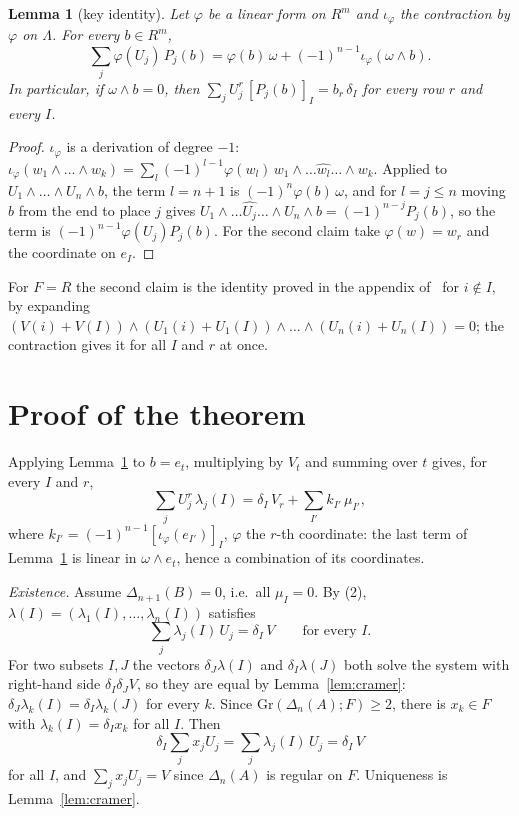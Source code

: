 \documentclass[11pt]{amsart}
\newtheorem{lemma}[theorem]{Lemma}
\theoremstyle{definition}
\theoremstyle{remark}
\newcommand{\Gr}{\mathrm{Gr}}
\newcommand{\co}[2]{[#1]_{#2}}
\begin{document}
\begin{lemma}[key identity]\label{lem:key}
Let $\varphi$ be a linear form on $R^m$ and $\iota_\varphi$ the contraction
by $\varphi$ on $\Lambda$.  For every $b\in R^m$,
\[
  \textstyle\sum_j\varphi(U_j)\,P_j(b)=\varphi(b)\,\omega
  +(-1)^{n-1}\iota_\varphi(\omega\wedge b).
\]
In particular, if $\omega\wedge b=0$, then
$\sum_jU_j^r\,\co{P_j(b)}I=b_r\,\delta_I$ for every row $r$ and every $I$.
\end{lemma}

\begin{proof}
$\iota_\varphi$ is a derivation of degree $-1$:
$\iota_\varphi(w_1\wedge\dots\wedge w_k)=\sum_l(-1)^{l-1}\varphi(w_l)\,
w_1\wedge\dots\widehat{w_l}\dots\wedge w_k$.  Applied to
$U_1\wedge\dots\wedge U_n\wedge b$, the term $l=n+1$ is
$(-1)^n\varphi(b)\,\omega$, and for $l=j\leq n$ moving $b$ from the end
to place $j$ gives $U_1\wedge\dots\widehat{U_j}\dots\wedge U_n\wedge
b=(-1)^{n-j}P_j(b)$, so the term is $(-1)^{n-1}\varphi(U_j)P_j(b)$.  For the
second claim take $\varphi(w)=w_r$ and the coordinate on $e_I$.
\end{proof}

For $F=R$ the second claim is the identity proved in the appendix
of~\cite{Co10} for $i\notin I$, by expanding
$(V(i)+V(I))\wedge(U_1(i)+U_1(I))\wedge\dots\wedge(U_n(i)+U_n(I))=0$; the
contraction gives it for all $I$ and $r$ at once.

\section{Proof of the theorem}

Applying Lemma~\ref{lem:key} to $b=e_t$, multiplying by $V_t$ and summing
over $t$ gives, for every $I$ and $r$,
\[
  \textstyle\sum_jU_j^r\,\lambda_j(I)=\delta_I\,V_r+\sum_{I'}k_{I'}\,\mu_{I'},
  \tag{2}
\]
where $k_{I'}=(-1)^{n-1}\co{\iota_\varphi(e_{I'})}I$, $\varphi$ the $r$-th
coordinate: the last term of Lemma~\ref{lem:key} is linear in
$\omega\wedge e_t$, hence a combination of its coordinates.

\emph{Existence.}  Assume $\Delta_{n+1}(B)=0$, i.e.\ all $\mu_I=0$.  By
(2), $\lambda(I)=(\lambda_1(I),\dots,\lambda_n(I))$ satisfies
\[
  \textstyle\sum_j\lambda_j(I)\,U_j=\delta_I\,V\qquad\text{for every }I.
\]
For two subsets $I,J$ the vectors $\delta_J\lambda(I)$ and
$\delta_I\lambda(J)$ both solve the system with right-hand side
$\delta_I\delta_JV$, so they are equal by Lemma~\ref{lem:cramer}:
$\delta_J\lambda_k(I)=\delta_I\lambda_k(J)$ for every $k$.  Since
$\Gr(\Delta_n(A);F)\geq2$, there is $x_k\in F$ with
$\lambda_k(I)=\delta_Ix_k$ for all $I$.  Then
\[
  \textstyle\delta_I\sum_jx_jU_j=\sum_j\lambda_j(I)\,U_j=\delta_I\,V
\]
for all $I$, and $\sum_jx_jU_j=V$ since $\Delta_n(A)$ is regular on $F$.
Uniqueness is Lemma~\ref{lem:cramer}.
\end{document}
